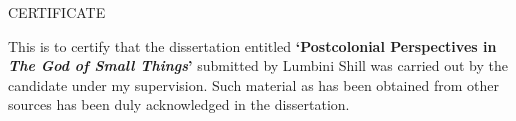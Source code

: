 \newpage
{}
\begin{center}
    \LARGE CERTIFICATE
\end{center}

This  is  to  certify  that  the  dissertation  entitled  \textbf{‘Postcolonial  Perspectives  in  \emph{The  God  of  Small  Things}’}  submitted  by  Lumbini  Shill  was  carried  out  by  the  candidate  under  my  supervision.  Such  material  as  has  been  obtained  from  other  sources  has  been  duly  acknowledged  in  the  dissertation.

\vspace{40pt}

\makeatletter
\signat{\empty}{\textbf{\@date}} \hfill {}
\makeatother